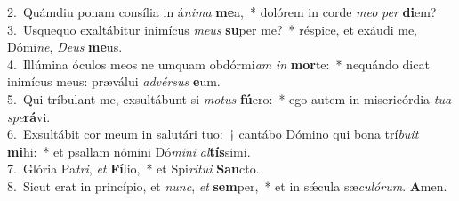 {2.~}Quámdiu ponam consília in á\textit{ni}\textit{ma} \textbf{me}a,~* dolórem in corde \textit{me}\textit{o} \textit{per} \textbf{di}em?\\
{3.~}Usquequo exaltábitur inimícus \textit{me}\textit{us} \textbf{su}per me?~* réspice, et exáudi me, Dómi\textit{ne}, \textit{De}\textit{us} \textbf{me}us.\\
{4.~}Illúmina óculos meos ne umquam obdórmi\textit{am} \textit{in} \textbf{mor}te:~* nequándo dicat inimícus meus: præválui \textit{ad}\textit{vér}\textit{sus} \textbf{e}um.\\
{5.~}Qui tríbulant me, exsultábunt si \textit{mo}\textit{tus} \textbf{fú}ero:~* ego autem in misericórdia \textit{tu}\textit{a} \textit{spe}\textbf{rá}vi.\\
{6.~}Exsultábit cor meum in salutári tuo:~† cantábo Dómino qui bona trí\textit{bu}\textit{it} \textbf{mi}hi:~* et psallam nómini Dó\textit{mi}\textit{ni} \textit{al}\textbf{tís}simi.\\
{7.~}Glória Pa\textit{tri}, \textit{et} \textbf{Fí}lio,~* et Spi\textit{rí}\textit{tu}\textit{i} \textbf{San}cto.\\
{8.~}Sicut erat in princípio, et \textit{nunc}, \textit{et} \textbf{sem}per,~* et in sǽcula sæ\textit{cu}\textit{ló}\textit{rum}. \textbf{A}men.\\
